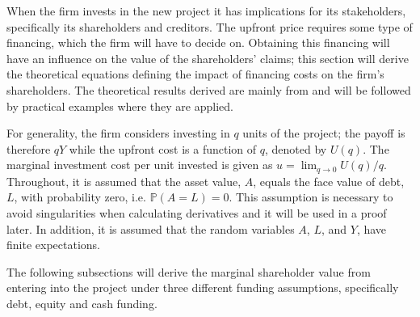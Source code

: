 \documentclass[main.tex]{subfiles}
\begin{document}
    When the firm invests in the new project it has implications for its stakeholders,
    specifically its shareholders and creditors.
    The upfront price requires some type of financing, 
    which the firm will have to decide on.
    Obtaining this financing will have an influence on the value of the shareholders' claims;
    this section will derive the theoretical equations defining
    the impact of financing costs on the firm's shareholders.
    The theoretical results derived are mainly from \textcite{ADS2019} 
    and will be followed by practical examples where they are applied.

    For generality, the firm considers investing in $q$ units of the project; 
    the payoff is therefore $qY$ while the upfront cost is a function of $q$, denoted by $U(q)$. 
    The marginal investment cost per unit invested is given as 
    $u = \lim_{q\rightarrow 0} U(q) / q$.
    Throughout, it is assumed that the asset value, $A$, equals the face value of debt, $L$, 
    with probability zero, i.e. $\mathbb{P}\left(A = L\right) = 0$.
    This assumption is necessary to avoid singularities when calculating derivatives
    and it will be used in a proof later.
    In addition, it is assumed that the random variables
    $A$, $L$, and $Y$, have finite expectations.

    The following subsections will derive the marginal shareholder value from entering into the project
    under three different funding assumptions, specifically debt, equity and cash funding.
\end{document}
